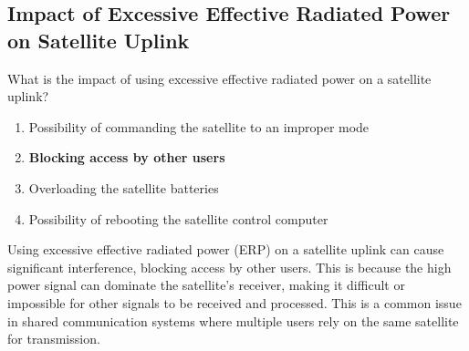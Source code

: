 \subsection{Impact of Excessive Effective Radiated Power on Satellite Uplink}
\label{T8B02}

\begin{tcolorbox}[colback=gray!10!white,colframe=black!75!black,title=T8B02]
What is the impact of using excessive effective radiated power on a satellite uplink?
\begin{enumerate}[noitemsep]
    \item Possibility of commanding the satellite to an improper mode
    \item \textbf{Blocking access by other users}
    \item Overloading the satellite batteries
    \item Possibility of rebooting the satellite control computer
\end{enumerate}
\end{tcolorbox}

Using excessive effective radiated power (ERP) on a satellite uplink can cause significant interference, blocking access by other users. This is because the high power signal can dominate the satellite's receiver, making it difficult or impossible for other signals to be received and processed. This is a common issue in shared communication systems where multiple users rely on the same satellite for transmission.